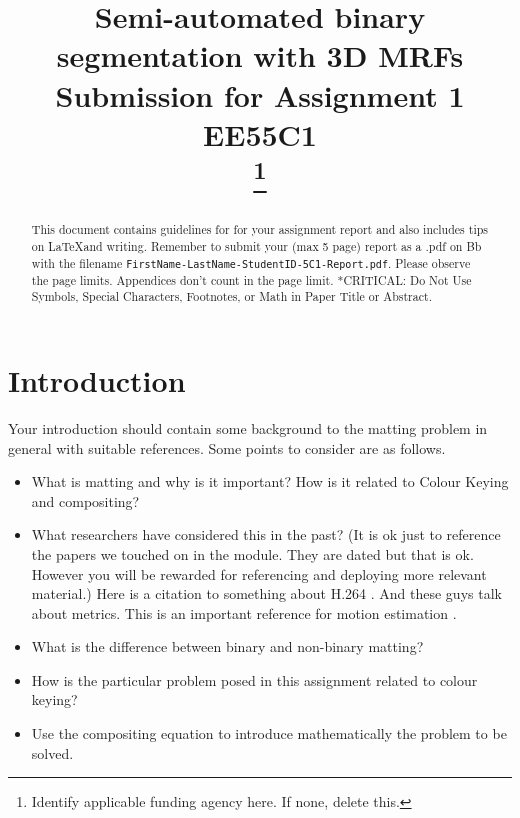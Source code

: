 \documentclass[conference]{IEEEtran}
\begin{document}
\title{Semi-automated binary segmentation with 3D MRFs\\{\large Submission for Assignment 1 EE55C1}\\
\thanks{Identify applicable funding agency here. If none, delete this.}
}

\author{
}
\maketitle

\begin{abstract}
This document contains guidelines for for your assignment report and also includes tips on \LaTeX and writing. Remember to submit your (max 
5 page) report as a .pdf on Bb with the filename {\tt FirstName-LastName-StudentID-5C1-Report.pdf}.
Please observe the page limits. Appendices don't count in the page limit. *CRITICAL: Do Not Use Symbols, Special Characters, Footnotes, 
or Math in Paper Title or Abstract.
\end{abstract}


\section{Introduction} 
Your introduction should contain some background to the matting problem in general with suitable references. Some points to consider are as follows.
\begin{itemize}
    \item What is matting and why is it important? How is it related to Colour Keying and compositing?
    \item What researchers have considered this in the past? (It is ok just to reference the papers we touched on in the module. They are dated but that is ok. However you will be rewarded for referencing and deploying more relevant material.) Here is a citation to something about H.264 \cite{h264book}. And these guys \cite{metrics} talk about metrics. This is an important reference for motion estimation \cite{Sintel}.
    \item What is the difference between binary and non-binary matting?
    \item How is the particular problem posed in this assignment related to colour keying?
    \item Use the compositing equation to introduce mathematically the problem to be solved.
\end{itemize}
\end{document}
